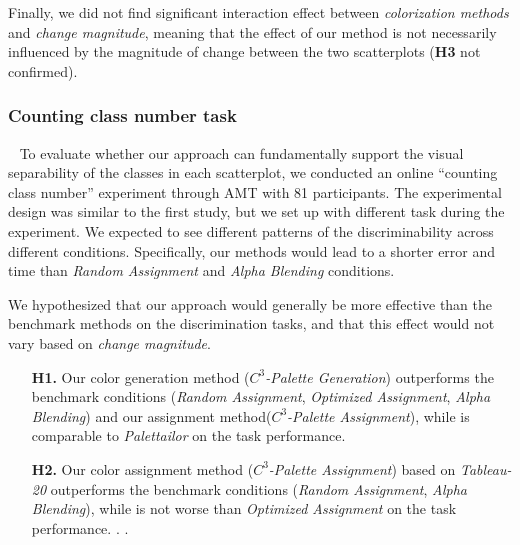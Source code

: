 {Finally, we did not find significant interaction effect between \emph{colorization methods} and \emph{change magnitude}, meaning that the effect of our method is not necessarily influenced by the magnitude of change between the two scatterplots (\textbf{H3} not confirmed).


\subsubsection{Counting class number task}
\
\newline
To evaluate whether our approach can fundamentally support the visual separability of the classes in each scatterplot, we conducted an online ``counting class number'' experiment through AMT with 81 participants. The experimental design was similar to the first study, but we set up with different task during the experiment.
We expected to see different patterns of the discriminability across different conditions. Specifically, our methods would lead to a shorter error and time than \emph{Random Assignment} and \emph{Alpha Blending} conditions.

\vspace{.3em}
 We hypothesized that our approach would generally be more effective than the benchmark methods on the discrimination tasks, and that this effect would not vary based on \emph{change magnitude}.
\begin{itemize}[noitemsep]
\setlength{\itemsep}{5pt}
    \item[\textbf{H1.}] Our color generation method (\emph{$C^3$-Palette Generation}) outperforms the benchmark conditions (\emph{Random Assignment}, \emph{Optimized Assignment}, \emph{Alpha Blending}) and our assignment method(\emph{$C^3$-Palette Assignment}), while is comparable to  \emph{Palettailor} on the task performance.

    \item [\textbf{H2.}] Our color assignment method (\emph{$C^3$-Palette Assignment}) based on \emph{Tableau-20} outperforms the benchmark conditions (\emph{Random Assignment}, \emph{Alpha Blending}), while is not worse than \emph{Optimized Assignment} on the task performance. . .


\end{itemize}}
